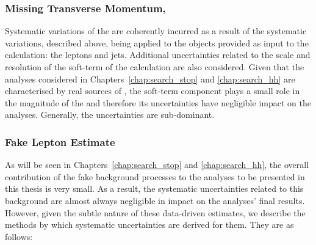 \subsubsection{Missing Transverse Momentum, \met}
Systematic variations of the \met are coherently incurred as a result of the
systematic variations, described above, being applied to the objects provided as input to the \met calculation:
the leptons and jets.
Additional uncertainties related to the scale and resolution of the soft-term of the \met calculation
are also considered.
Given that the analyses considered in Chapters~\ref{chap:search_stop} and \ref{chap:search_hh}
are characterised by real sources of \met, the soft-term component plays a small role in the magnitude
of the \met and therefore its uncertainties have negligible impact on the analyses.
Generally, the \met uncertainties are sub-dominant.

\subsubsection{Fake Lepton Estimate}

As will be seen in Chapters~\ref{chap:search_stop} and \ref{chap:search_hh}, the overall contribution
of the fake background processes to the analyses to be presented in this thesis is very small.
As a result, the systematic uncertainties related to this background are almost always negligible
in impact on the analyses' final results.
However, given the subtle nature of these data-driven estimates, we describe the methods by which
systematic uncertainties are derived for them.
They are as follows:

